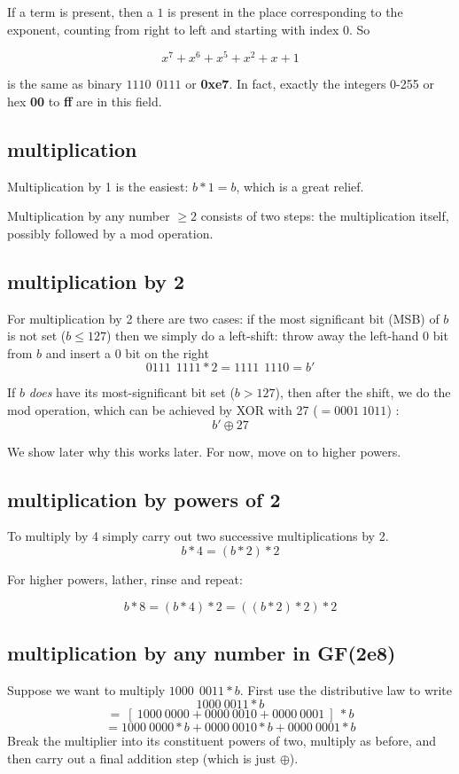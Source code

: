 \documentclass[11pt, oneside]{article}
\begin{document}
If a term is present, then a $1$ is present in the place corresponding to the exponent, counting from right to left and starting with index 0. So

\[ x^7 + x^6 + x^5 + x^2 + x + 1 \]

is the same as binary $1110 \  \  0111$ or \textbf{0xe7}.  In fact, exactly the integers 0-255 or hex \textbf{00} to \textbf{ff} are in this field.

\subsection*{multiplication}

Multiplication by 1 is the easiest:  $b * 1 = b$, which is a great relief.

Multiplication by any number $\ge 2$ consists of two steps:  the multiplication itself, possibly followed by a mod operation.

\subsection*{multiplication by 2}

For multiplication by 2 there are two cases:  if the most significant bit (MSB) of $b$ is not set ($b \le 127$) then we simply do a left-shift:  throw away the left-hand 0 bit from $b$ and insert a $0$ bit on the right
\[ 0111 \  \  1111 * 2 =  1111 \  \  1110 = b' \]

If $b$ \emph{does} have its most-significant bit set ($b > 127$), then after the shift, we do the mod operation, which can be achieved by XOR with 27 ($ = 0001\ 1011$)	:
\[ b' \oplus 27 \]

We show later why this works later.  For now, move on to higher powers.

\subsection*{multiplication by powers of 2}

To multiply by 4 simply carry out two successive multiplications by 2.
\[ b * 4 = (b * 2) * 2 \]

For higher powers, lather, rinse and repeat:

\[ b * 8 = (b * 4) * 2 = ((b * 2) * 2) * 2 \]

\subsection*{multiplication by any number in GF(2e8)}
Suppose we want to multiply $ 1000 \  \  0011 * b$.  First use the distributive law to write
\[ 1000 \   0011 * b \]
\[ = \ [ \ 1000 \   0000  + 0000 \  0010  + 0000 \   0001 \ ] \ * b \]
\[ = 1000 \  0000 * b + 0000 \  0010 * b + 0000 \  0001 * b \]
Break the multiplier into its constituent powers of two, multiply as before, and then carry out a final  addition step (which is just $\oplus$).
\end{document}
